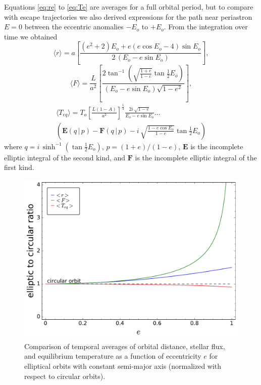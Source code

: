 \documentclass[a4paper,fleqn,usenatbib]{mnras}
\begin{document}

Equations \ref{eq:re} to \ref{eq:Te} are averages for a full orbital period, but to compare with escape trajectories we also derived expressions for the path near periastron $E=0$ between the eccentric anomalies $-E_o$ to $+E_o$. From the integration over time we obtained
\begin{equation} \label{eq:re2}
\langle r \rangle = a \left[ \frac{{{\left(e^{2} + 2\right)} E_o} + {e\left(e \cos{E_o} - 4\right)} \sin{E_o}}{2 \, {\left(E_o - e\sin{E_o}\right)}} \right],
\end{equation}
\begin{equation} \label{eq:Fe2}
\langle F \rangle = \frac{L}{a^2} \left[ \frac{2 \tan^{-1}\left(\sqrt{\frac{1 + e}{1 - e}} \tan{\frac{1}{2} E_o}\right)}{ {\left(E_o - e \sin{E_o} \right)}\sqrt{1-e^{2}}} \right],
\end{equation}
\begin{multline} \label{eq:Te2}
\langle T_{eq} \rangle = T_o \left[\frac{L {\left(1-A\right)}}{a^{2}}\right]^{\frac{1}{4}} \frac{2 i \,  \sqrt{1-e}}{ E_o - e \sin{E_o} } \ldots \\
\left(\mathbf{E} \left(q \,\big|\,p \right) - \mathbf{F} \left(q \,\big|\,p\right) -i \, \sqrt{\frac{1- e \cos{E_o}}{1 - e}} \tan{\frac{1}{2} E_o} \right)
\end{multline}
where $q = i \, \sinh^{-1}(\tan{\frac{1}{2} E_o})$, $p=(1+e)/(1-e)$, $\mathbf{E}$ is the incomplete elliptic integral of the second kind, and $\mathbf{F}$ is the incomplete elliptic integral of the first kind.


\begin{figure}
\includegraphics[width=\columnwidth]{f2.pdf}
\caption{Comparison of temporal averages of orbital distance, stellar flux, and equilibrium temperature as a function of eccentricity $e$ for elliptical orbits with constant semi-major axis (normalized with respect to circular orbits).}
\label{fig2}
\end{figure}
\end{document}
